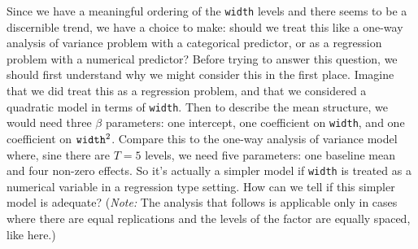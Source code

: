 \documentclass[a4paper, 12pt]{article}
\theoremstyle{plain}
\theoremstyle{definition}
\theoremstyle{remark}
\begin{document}
Since we have a meaningful ordering of the {\tt width} levels and there seems to be a discernible trend, we have a choice to make: should we treat this like a one-way analysis of variance problem with a categorical predictor, or as a regression problem with a numerical predictor?  Before trying to answer this question, we should first understand why we might consider this in the first place.  Imagine that we did treat this as a regression problem, and that we considered a quadratic model in terms of {\tt width}.  Then to describe the mean structure, we would need three $\beta$ parameters: one intercept, one coefficient on {\tt width}, and one coefficient on ${\tt width}^2$.  Compare this to the one-way analysis of variance model where, sine there are $T=5$ levels, we need five parameters: one baseline mean and four non-zero effects.  So it's actually a simpler model if {\tt width} is treated as a numerical variable in a regression type setting.  How can we tell if this simpler model is adequate?  ({\em Note:} The analysis that follows is applicable only in cases where there are equal replications and the levels of the factor are equally spaced, like here.) 
\end{document}
